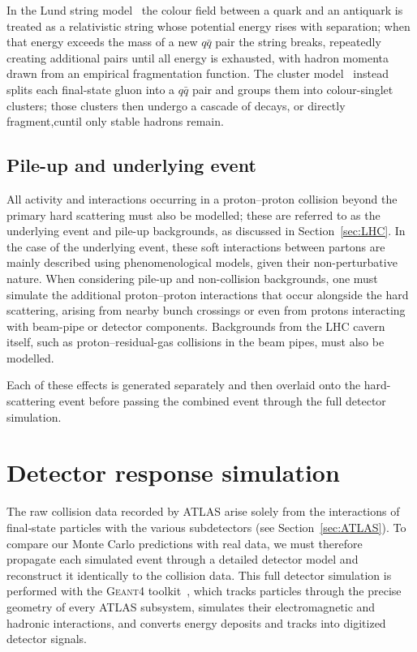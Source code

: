 In the Lund string model~\cite{ANDERSSON198331} the colour field between a quark and an antiquark is treated as a relativistic string whose potential energy rises with separation; when that energy exceeds the mass of a new $q\bar{q}$ pair the string breaks, repeatedly creating additional pairs until all energy is exhausted, with hadron momenta drawn from an empirical fragmentation function. 
The cluster model~\cite{Winter_2004} instead splits each final-state gluon into a $q\bar{q}$ pair and groups them into colour-singlet clusters; those clusters then undergo a cascade of decays, or directly fragment,cuntil only stable hadrons remain.

\subsection*{Pile-up and underlying event}
\label{subsec:Pile}

All activity and interactions occurring in a proton–proton collision beyond the primary hard scattering must also be modelled; these are referred to as the underlying event and pile-up backgrounds, as discussed in Section~\ref{sec:LHC}. 
In the case of the underlying event, these soft interactions between partons are mainly described using phenomenological models, given their non-perturbative nature.  When considering pile-up and non-collision backgrounds, one must simulate the additional proton–proton interactions that occur alongside the hard scattering, arising from nearby bunch crossings or even from protons interacting with beam-pipe or detector components.  Backgrounds from the LHC cavern itself, such as proton–residual-gas collisions in the beam pipes, must also be modelled.  

Each of these effects is generated separately and then overlaid onto the hard-scattering event before passing the combined event through the full detector simulation.



\section{Detector response simulation}
\label{sec:Detector}

The raw collision data recorded by ATLAS arise solely from the interactions of final‐state particles with the various subdetectors (see Section~\ref{sec:ATLAS}). To compare our Monte Carlo predictions with real data, we must therefore propagate each simulated event through a detailed detector model and reconstruct it identically to the collision data.  This full detector simulation is performed with the \textsc{Geant4} toolkit~\cite{AGOSTINELLI2003250}, which tracks particles through the precise geometry of every ATLAS subsystem, simulates their electromagnetic and hadronic interactions, and converts energy deposits and tracks into digitized detector signals.


